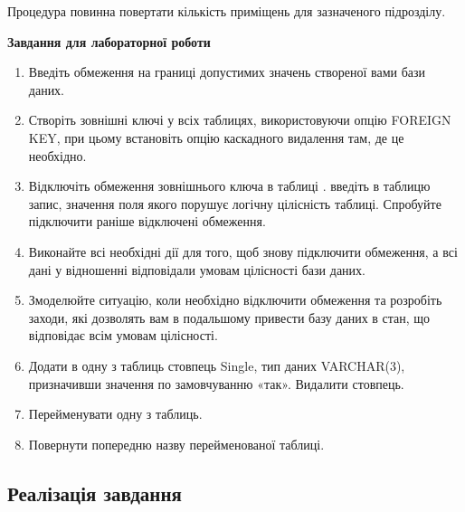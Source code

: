 \documentclass[a4paper,12pt]{article}
\begin{document}
	Процедура повинна повертати кількість приміщень для зазначеного підрозділу. \\
	\begin{center}
		\textbf{Завдання для лабораторної роботи}
	\end{center}
	\begin{enumerate}
		\item Введіть обмеження на границі допустимих значень створеної вами бази даних.
		\item Створіть зовнішні ключі у всіх таблицях, використовуючи опцію FOREIGN KEY, при цьому встановіть опцію каскадного видалення там, де це необхідно.
		\item Відключіть обмеження зовнішнього ключа в таблиці . введіть в таблицю запис, значення поля якого порушує логічну цілісність таблиці. Спробуйте підключити раніше відключені обмеження.
		\item Виконайте всі необхідні дії для того, щоб знову підключити обмеження, а всі дані у відношенні відповідали умовам цілісності бази даних.

\newpage
		\item Змоделюйте ситуацію, коли необхідно відключити обмеження та розробіть заходи, які дозволять вам в подальшому привести базу даних в стан, що відповідає всім умовам цілісності.
		\item Додати в одну з таблиць стовпець Single, тип даних VARCHAR(3), призначивши значення по замовчуванню «так». Видалити стовпець.
		\item Перейменувати одну з таблиць.
		\item Повернути попередню назву перейменованої таблиці. 
	\end{enumerate}
	
	
	\begin{center}
		\section*{\bfseries{Реалізація завдання}}
	\end{center}
\end{document}
